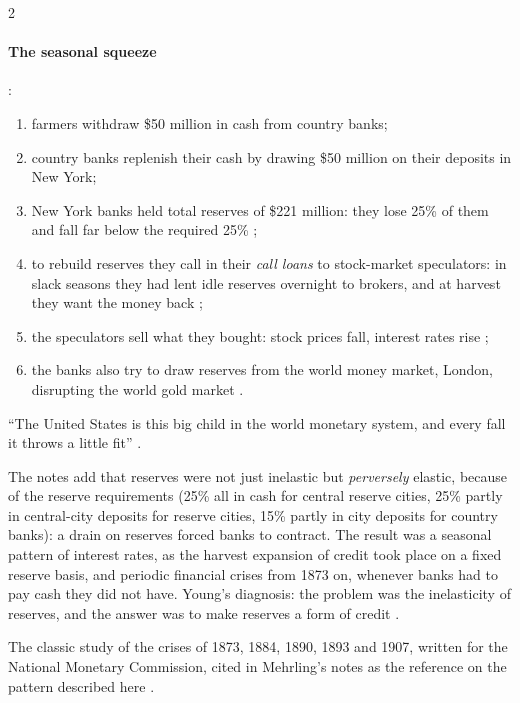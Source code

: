 \begin{paracol}{2}
\paragraph{The seasonal squeeze} :
\begin{enumerate}
  \item farmers withdraw \$50 million in cash from country banks;
  \item country banks replenish their cash by drawing \$50 million on their deposits in New York;
  \item New York banks held total reserves of \$221 million: they lose 25\% of them and fall far below the required 25\%
        ;
  \item to rebuild reserves they call in their \emph{call loans} to stock-market speculators: in slack seasons they had lent idle
        reserves overnight to brokers, and at harvest they want the money back ;
  \item the speculators sell what they bought: stock prices fall, interest rates rise ;
  \item the banks also try to draw reserves from the world money market, London, disrupting the world gold market
        .
\end{enumerate}
``The United States is this big child in the world monetary system, and every fall it throws a little fit'' .

The notes add that reserves were not just inelastic but \emph{perversely} elastic, because of the reserve requirements (25\% all in cash for
central reserve cities, 25\% partly in central-city deposits for reserve cities, 15\% partly in city deposits for country banks): a drain
on reserves forced banks to contract. The result was a seasonal pattern of interest rates, as the harvest expansion of credit took place on a
fixed reserve basis, and periodic financial crises from 1873 on, whenever banks had to pay cash they did not have. Young's diagnosis: the
problem was the inelasticity of reserves, and the answer was to make reserves a form of credit .

\begin{reading}
The classic study of the crises of 1873, 1884, 1890, 1893 and 1907, written for the National Monetary Commission, cited in Mehrling's notes as
the reference on the pattern described here .
\end{reading}


\end{paracol}

